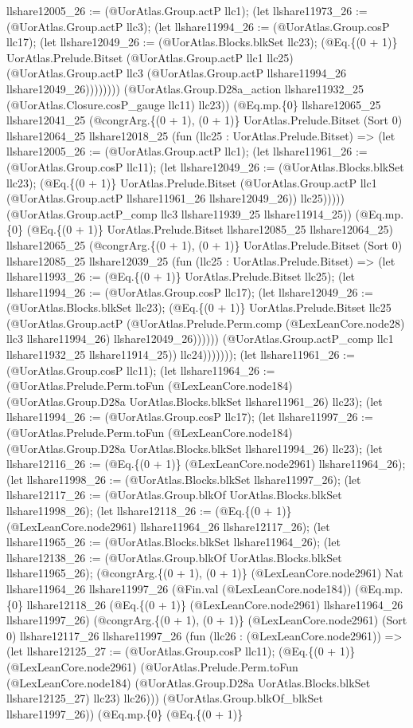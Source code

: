\documentclass[11pt]{article}
\begin{document}
llshare12005\_26 := (@UorAtlas.Group.actP llc1); (let llshare11973\_26 := (@UorAtlas.Group.actP llc3); (let llshare11994\_26 := (@UorAtlas.Group.cosP llc17); (let llshare12049\_26 := (@UorAtlas.Blocks.blkSet llc23); (@Eq.\{(0 + 1)\} UorAtlas.Prelude.Bitset (@UorAtlas.Group.actP llc1 llc25) (@UorAtlas.Group.actP llc3 (@UorAtlas.Group.actP llshare11994\_26 llshare12049\_26)))))))) (@UorAtlas.Group.D28a\_action llshare11932\_25 (@UorAtlas.Closure.cosP\_gauge llc11) llc23)) (@Eq.mp.\{0\} llshare12065\_25 llshare12041\_25 (@congrArg.\{(0 + 1), (0 + 1)\} UorAtlas.Prelude.Bitset (Sort 0) llshare12064\_25 llshare12018\_25 (fun (llc25 : UorAtlas.Prelude.Bitset) => (let llshare12005\_26 := (@UorAtlas.Group.actP llc1); (let llshare11961\_26 := (@UorAtlas.Group.cosP llc11); (let llshare12049\_26 := (@UorAtlas.Blocks.blkSet llc23); (@Eq.\{(0 + 1)\} UorAtlas.Prelude.Bitset (@UorAtlas.Group.actP llc1 (@UorAtlas.Group.actP llshare11961\_26 llshare12049\_26)) llc25))))) (@UorAtlas.Group.actP\_comp llc3 llshare11939\_25 llshare11914\_25)) (@Eq.mp.\{0\} (@Eq.\{(0 + 1)\} UorAtlas.Prelude.Bitset llshare12085\_25 llshare12064\_25) llshare12065\_25 (@congrArg.\{(0 + 1), (0 + 1)\} UorAtlas.Prelude.Bitset (Sort 0) llshare12085\_25 llshare12039\_25 (fun (llc25 : UorAtlas.Prelude.Bitset) => (let llshare11993\_26 := (@Eq.\{(0 + 1)\} UorAtlas.Prelude.Bitset llc25); (let llshare11994\_26 := (@UorAtlas.Group.cosP llc17); (let llshare12049\_26 := (@UorAtlas.Blocks.blkSet llc23); (@Eq.\{(0 + 1)\} UorAtlas.Prelude.Bitset llc25 (@UorAtlas.Group.actP (@UorAtlas.Prelude.Perm.comp (@LexLeanCore.node28) llc3 llshare11994\_26) llshare12049\_26)))))) (@UorAtlas.Group.actP\_comp llc1 llshare11932\_25 llshare11914\_25)) llc24))))))); (let llshare11961\_26 := (@UorAtlas.Group.cosP llc11); (let llshare11964\_26 := (@UorAtlas.Prelude.Perm.toFun (@LexLeanCore.node184) (@UorAtlas.Group.D28a UorAtlas.Blocks.blkSet llshare11961\_26) llc23); (let llshare11994\_26 := (@UorAtlas.Group.cosP llc17); (let llshare11997\_26 := (@UorAtlas.Prelude.Perm.toFun (@LexLeanCore.node184) (@UorAtlas.Group.D28a UorAtlas.Blocks.blkSet llshare11994\_26) llc23); (let llshare12116\_26 := (@Eq.\{(0 + 1)\} (@LexLeanCore.node2961) llshare11964\_26); (let llshare11998\_26 := (@UorAtlas.Blocks.blkSet llshare11997\_26); (let llshare12117\_26 := (@UorAtlas.Group.blkOf UorAtlas.Blocks.blkSet llshare11998\_26); (let llshare12118\_26 := (@Eq.\{(0 + 1)\} (@LexLeanCore.node2961) llshare11964\_26 llshare12117\_26); (let llshare11965\_26 := (@UorAtlas.Blocks.blkSet llshare11964\_26); (let llshare12138\_26 := (@UorAtlas.Group.blkOf UorAtlas.Blocks.blkSet llshare11965\_26); (@congrArg.\{(0 + 1), (0 + 1)\} (@LexLeanCore.node2961) Nat llshare11964\_26 llshare11997\_26 (@Fin.val (@LexLeanCore.node184)) (@Eq.mp.\{0\} llshare12118\_26 (@Eq.\{(0 + 1)\} (@LexLeanCore.node2961) llshare11964\_26 llshare11997\_26) (@congrArg.\{(0 + 1), (0 + 1)\} (@LexLeanCore.node2961) (Sort 0) llshare12117\_26 llshare11997\_26 (fun (llc26 : (@LexLeanCore.node2961)) => (let llshare12125\_27 := (@UorAtlas.Group.cosP llc11); (@Eq.\{(0 + 1)\} (@LexLeanCore.node2961) (@UorAtlas.Prelude.Perm.toFun (@LexLeanCore.node184) (@UorAtlas.Group.D28a UorAtlas.Blocks.blkSet llshare12125\_27) llc23) llc26))) (@UorAtlas.Group.blkOf\_blkSet llshare11997\_26)) (@Eq.mp.\{0\} (@Eq.\{(0 + 1)\} 
\end{document}
